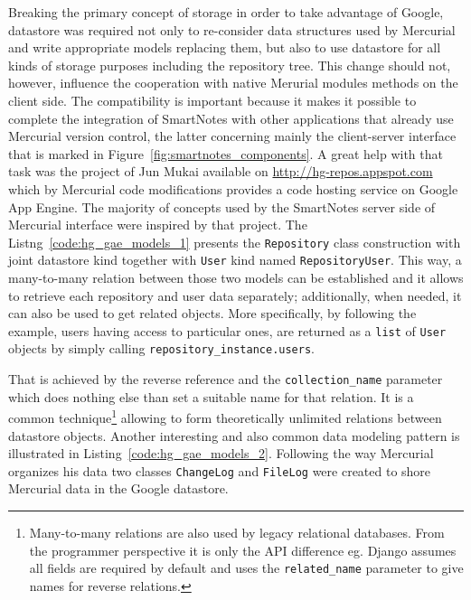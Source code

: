 Breaking the primary concept of storage in order to take advantage of Google, datastore was required not only to re-consider data structures used by Mercurial and write appropriate models replacing them, but also to use datastore for all kinds of storage purposes including the repository tree. This change should not, however, influence the cooperation with native Merurial modules methods on the client side. The compatibility is important because it makes it possible to complete the integration of SmartNotes with other applications that already use Mercurial version control, the latter concerning mainly the client-server interface that is marked in Figure~\ref{fig:smartnotes_components}. A great help with that task was the project of Jun Mukai available on \url{http://hg-repos.appspot.com} which by Mercurial code modifications provides a code hosting service on Google App Engine. The majority of concepts used by the SmartNotes server side of Mercurial interface were inspired by that project. The Listng~\ref{code:hg_gae_models_1} presents the \texttt{Repository} class construction with joint datastore kind together with \texttt{User} kind named \texttt{RepositoryUser}. This way, a many-to-many relation between those two models can be established and it allows to retrieve each repository and user data separately; additionally, when needed, it can also be used to get related objects. More specifically, by following the example, users having access to particular ones, are returned as a \texttt{list} of \texttt{User} objects by simply calling \texttt{repository\_instance.users}.  

That is achieved by the reverse reference and the \texttt{collection\_name} parameter which does nothing else than set a suitable name for that relation. It is a common technique\footnote{Many-to-many relations are also used by legacy relational databases. From the programmer perspective it is only the API difference eg. Django assumes all fields are required by default and uses the \texttt{related\_name} parameter to give names for reverse relations.} allowing to form theoretically unlimited relations between datastore objects. Another interesting and also common data modeling pattern is illustrated in Listing~\ref{code:hg_gae_models_2}. Following the way Mercurial organizes his data two classes \texttt{ChangeLog} and \texttt{FileLog} were created to shore Mercurial data in the Google datastore.

